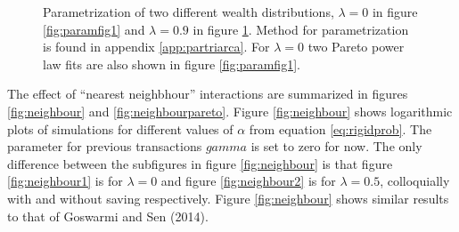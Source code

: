 \documentclass[10pt, a4paper]{amsart}
\begin{document}
\begin{figure}
\begin{subfigure}{.5\textwidth}
  \caption{}
  \label{fig:paramfig2}
\end{subfigure}
\caption{Parametrization of two different wealth distributions, $\lambda=0$ in figure \ref{fig:paramfig1} and $\lambda=0.9$ in figure \ref{fig:paramfig2}. Method for parametrization is found in appendix \ref{app:partriarca}. For $\lambda=0$ two Pareto power law fits are also shown in figure \ref{fig:paramfig1}.}
\label{fig:paramfig}
\end{figure}


The effect of ``nearest neighbhour'' interactions are summarized in figures \ref{fig:neighbour} and \ref{fig:neighbourpareto}. Figure \ref{fig:neighbour} shows logarithmic plots of simulations for different values of $\alpha$ from equation \ref{eq:rigidprob}. The parameter for previous transactions $gamma$ is set to zero for now. The only difference between the subfigures in figure \ref{fig:neighbour} is that figure \ref{fig:neighbour1} is for $\lambda=0$ and figure \ref{fig:neighbour2} is for $\lambda=0.5$, colloquially with and without saving respectively. Figure \ref{fig:neighbour} shows similar results to that of Goswarmi and Sen (2014)\cite{GoswamiSen}.
\end{document}
